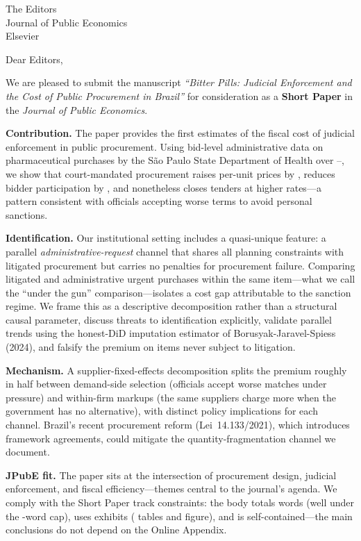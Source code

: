 \documentclass[11pt,a4paper]{letter}
\date{\BPsubmissionDate}
\begin{document}
\begin{letter}{The Editors \\ Journal of Public Economics \\ Elsevier}

\opening{Dear Editors,}

We are pleased to submit the manuscript \emph{``Bitter Pills: Judicial Enforcement and the Cost of Public Procurement in Brazil''} for consideration as a \textbf{Short Paper} in the \emph{Journal of Public Economics}.

\medskip\noindent\textbf{Contribution.} The paper provides the first estimates of the fiscal cost of judicial enforcement in public procurement. Using bid-level administrative data on \BPnPOIfull{} pharmaceutical purchases by the S\~ao Paulo State Department of Health over \BPsampleStartYear--\BPsampleEndYear, we show that court-mandated procurement raises per-unit prices by \BPnegPctHeadline, reduces bidder participation by \BPfirmsPctHeadline, and nonetheless closes tenders at higher rates---a pattern consistent with officials accepting worse terms to avoid personal sanctions.

\medskip\noindent\textbf{Identification.} Our institutional setting includes a quasi-unique feature: a parallel \emph{administrative-request} channel that shares all planning constraints with litigated procurement but carries no penalties for procurement failure. Comparing litigated and administrative urgent purchases within the same item---what we call the ``under the gun'' comparison---isolates a \BPutgPctRange{} cost gap attributable to the sanction regime. We frame this as a descriptive decomposition rather than a structural causal parameter, discuss threats to identification explicitly, validate parallel trends using the honest-DiD imputation estimator of Borusyak-Jaravel-Spiess (2024), and falsify the premium on items never subject to litigation.

\medskip\noindent\textbf{Mechanism.} A supplier-fixed-effects decomposition splits the premium roughly in half between demand-side selection (officials accept worse matches under pressure) and within-firm markups (the same suppliers charge more when the government has no alternative), with distinct policy implications for each channel. Brazil's recent procurement reform (Lei~14.133/2021), which introduces framework agreements, could mitigate the quantity-fragmentation channel we document.

\medskip\noindent\textbf{JPubE fit.} The paper sits at the intersection of procurement design, judicial enforcement, and fiscal efficiency---themes central to the journal's agenda. We comply with the Short Paper track constraints: the body totals \BPbodyWordCount{} words (well under the \BPbodyWordCap-word cap), uses \BPexhibitsTotal{} exhibits (\BPexhibitsTables{} tables and \BPexhibitsFigures{} figure), and is self-contained---the main conclusions do not depend on the Online Appendix.


\end{letter}
\end{document}
